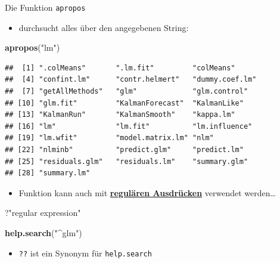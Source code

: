 \documentclass[ignorenonframetext,]{beamer}
\newenvironment{Shaded}{\begin{snugshade}}{\end{snugshade}}
\newcommand{\KeywordTok}[1]{\textcolor[rgb]{0.26,0.66,0.93}{\textbf{#1}}}
\newcommand{\NormalTok}[1]{\textcolor[rgb]{0.74,0.68,0.62}{#1}}
\newcommand{\StringTok}[1]{\textcolor[rgb]{0.02,0.61,0.04}{#1}}
\providecommand{\tightlist}{%
  \setlength{\itemsep}{0pt}\setlength{\parskip}{0pt}}
\begin{document}
\begin{frame}[fragile]{Die Funktion \texttt{apropos}}
\protect\hypertarget{die-funktion-apropos}{}

\begin{itemize}
\tightlist
\item
  durchsucht alles über den angegebenen String:
\end{itemize}

\begin{Shaded}
\begin{Highlighting}[]
\KeywordTok{apropos}\NormalTok{(}\StringTok{"lm"}\NormalTok{)}
\end{Highlighting}
\end{Shaded}

\begin{verbatim}
##  [1] ".colMeans"       ".lm.fit"         "colMeans"       
##  [4] "confint.lm"      "contr.helmert"   "dummy.coef.lm"  
##  [7] "getAllMethods"   "glm"             "glm.control"    
## [10] "glm.fit"         "KalmanForecast"  "KalmanLike"     
## [13] "KalmanRun"       "KalmanSmooth"    "kappa.lm"       
## [16] "lm"              "lm.fit"          "lm.influence"   
## [19] "lm.wfit"         "model.matrix.lm" "nlm"            
## [22] "nlminb"          "predict.glm"     "predict.lm"     
## [25] "residuals.glm"   "residuals.lm"    "summary.glm"    
## [28] "summary.lm"
\end{verbatim}

\begin{itemize}
\tightlist
\item
  Funktion kann auch mit
  \href{https://de.wikipedia.org/wiki/Regul\%C3\%A4rer_Ausdruck}{\textbf{regulären
  Ausdrücken}} verwendet werden\ldots{}
\end{itemize}

\begin{Shaded}
\begin{Highlighting}[]
\NormalTok{?}\StringTok{"regular expression"}
\end{Highlighting}
\end{Shaded}

\begin{Shaded}
\begin{Highlighting}[]
\KeywordTok{help.search}\NormalTok{(}\StringTok{"^glm"}\NormalTok{)}
\end{Highlighting}
\end{Shaded}

\begin{itemize}
\tightlist
\item
  \texttt{??} ist ein Synonym für \texttt{help.search}
\end{itemize}

\end{frame}
\end{document}
